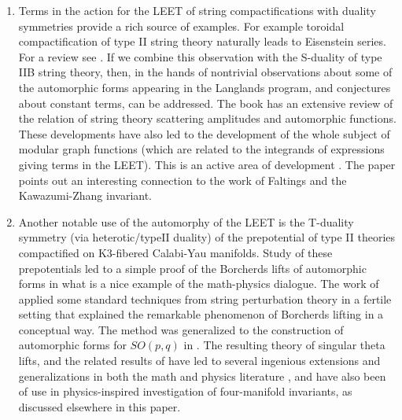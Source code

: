 \documentclass[12pt]{article}
\begin{document}
\begin{enumerate}
\item Terms in the action for the LEET of string compactifications with duality symmetries provide a rich source of examples.
For example toroidal compactification of type II string theory naturally leads to Eisenstein series. For a review see \cite{Obers:1998fb}. If we combine this observation with the S-duality of type IIB string theory,
then, in the hands of \cite{Green:2010kv,Green:2011vz,Green:2014yxa,Gourevitch:2019knu} 
nontrivial observations about some of the automorphic forms appearing in the Langlands program, and conjectures about constant terms, can be addressed.
The book \cite{Fleig:2015vky} has an extensive review of the relation of 
string theory scattering amplitudes and automorphic functions.  
These developments have also led to the development of the whole
subject of modular graph functions (which are related to the integrands of expressions giving terms in the LEET).
This is an active area of 
development
\cite{Pioline:2015qha,Broedel:2018izr,DHoker:2015wxz,DHoker:2017pvk,DHoker:2017zhq,DHoker:2020uid}.
The paper  \cite{Pioline:2015qha} points out an interesting connection to the work of Faltings and the Kawazumi-Zhang invariant.

\item Another notable use of the automorphy of the LEET is the T-duality symmetry 
(via heterotic/typeII duality) of the prepotential of type II theories compactified on K3-fibered Calabi-Yau manifolds. Study of these prepotentials led to a simple proof of the Borcherds lifts of automorphic forms \cite{Harvey:1995fq} in what is a nice example of the math-physics dialogue. The work of \cite{Harvey:1995fq} applied some standard techniques from string perturbation 
theory \cite{Dixon:1990pc} in a fertile setting that explained the
remarkable phenomenon of Borcherds lifting in a conceptual way. The method was generalized to the construction of automorphic forms for  $SO(p,q)$ in \cite{Borcherds:1996uda}. 
The resulting theory of singular theta lifts, and the related results of \cite{Dijkgraaf:1996xw}
have led to several ingenious extensions and generalizations in both the math 
and physics literature 
\cite{Bryan:2018nlv,
BruinierFunke,
Carnahan:2009mjm,
Dabholkar:2006xa,Eguchi:2011aj,
GritsenkoNikulinLorentzKM,
GottscheKoolRank2DMVV,
Klemm:2005pd,
Persson:2013xpa,
Pioline:2015qha,Angelantonj:2015rxa}, and have also been of use in physics-inspired 
investigation of four-manifold invariants, as discussed elsewhere 
in this paper. 
 


\end{enumerate}
\end{document}
